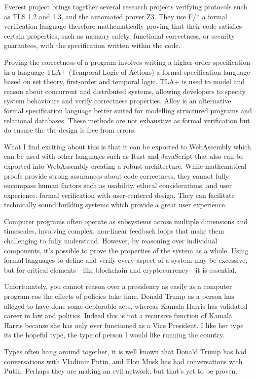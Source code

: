 \documentclass{article}
\begin{document}
Everest project brings together several research projects verifying protocols such as TLS 1.2 and 1.3, and the automated prover Z3. They use F/* a formal verification language therefore mathematically proving that their code satisfies certain properties, such as memory safety, functional correctness, or security guarantees, with the specification written within the code. 

Proving the correctness of a program involves writing a higher-order specification in a language  TLA+ (Temporal Logic of Actions) a formal specification language based on set theory, first-order and temporal logic.  TLA+ is used to model and reason about concurrent and distributed systems, allowing developers to specify system behaviours and verify correctness properties.  Alloy is an alternative formal specification language better suited for modelling structured programs and relational databases. These methods are not exhaustive as formal verification but do ensure the the design is free from errors. 

What I find exciting about this is that it can be exported to WebAssembly which can be used with other languages such as Rust and JavaScript that also can be exported into WebAssembly creating a robust architecture. While mathematical proofs provide strong assurances about code correctness, they cannot fully encompass human factors such as usability, ethical considerations, and user experience. formal verification with user-centered design. They can facilitate technically sound building systems which provide a great user experience.

Computer programs often operate as subsystems across multiple dimensions and timescales, involving complex, non-linear feedback loops that make them challenging to fully understand. However, by reasoning over individual components, it's possible to prove the properties of the system as a whole. Using formal languages to define and verify every aspect of a system may be excessive, but for critical elements—like blockchain and cryptocurrency—it is essential. 

Unfortunately, you cannot reason over a presidency as easily as a computer program cos the effects of policies take time. Donald Trump as a person has alleged to have done some deplorable acts, whereas Kamala Harris has validated career in law and politics. Indeed this is not a recursive function of Kamala Harris because she has only ever functioned as a Vice President.  I like her type its the hopeful type, the type of person I would like running the country.  

Types often hang around together, it is well known that Donald Trump has had conversations with Vladimir Putin, and Elon Musk has had conversations with Putin. Perhaps they are making an evil network, but that's yet to be proven.




 
\end{document}
